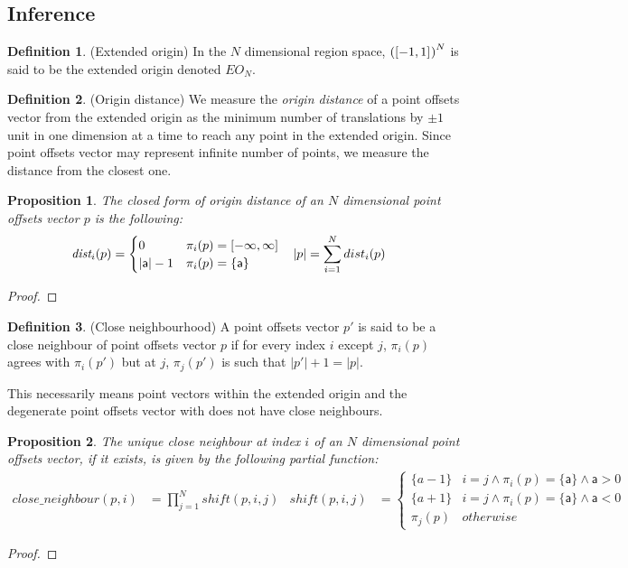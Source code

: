 \documentclass[acmlarge,review]{acmart}
\theoremstyle{definition}
\newtheorem{defn}{Definition}
\theoremstyle{plain}
\newtheorem{prop}{Proposition}
\theoremstyle{remark}
\begin{document}
\subsection{Inference}

\begin{defn}{(Extended origin)}
  In the $N$ dimensional region space, ${(\textnormal{$\lbrack-1,1\rbrack^{}$})}^N$ is said to be
  the extended origin denoted $\textit{EO}_N$.
\end{defn}

\begin{defn}{(Origin distance)}
  We measure the \emph{origin distance} of a point offsets vector from the
  extended origin as the minimum number of translations by $\pm 1$ unit in one
  dimension at a time to reach any point in the extended origin. Since point
  offsets vector may represent infinite number of points, we measure the
  distance from the closest one.
\end{defn}
%
\begin{prop}{}
  The closed form of origin distance of an $N$ dimensional point offsets vector
  $p$ is the following:
%
  \begin{align*}
    \textit{dist}_i(p) & = \begin{cases}
      0 & \pi_i(p) = \interv{-\infty}{\infty}{} \\
      |\mathsf{a}| - 1 & \pi_i(p) = \{\mathsf{a}\} \\
    \end{cases} &
%
    |p| & = \sum_{i=1}^{N} dist_i(p)
  \end{align*}
\end{prop}
%
\begin{proof}
\end{proof}

\begin{defn}{(Close neighbourhood)}
  A point offsets vector $p'$ is said to be a close neighbour of point offsets
  vector $p$ if for every index $i$ except $j$, $\pi_i(p)$ agrees with
  $\pi_i(p')$ but at $j$, $\pi_j(p')$ is such that $|p'| + 1 = |p|$.

  This necessarily means point vectors within the extended origin and the
  degenerate point offsets vector with \interv{-\infty}{\infty}{} does not have
  close neighbours.
\end{defn}
%
\begin{prop}
  The unique close neighbour at index $i$ of an $N$ dimensional point offsets
  vector, if it exists, is given by the following partial function:
%
  \begin{align*}
    \mathit{close\_neighbour}(p,i) & = \prod^{N}_{j=1} \mathit{shift}(p,i,j) &
%
    \mathit{shift}(p,i,j) & =
      \begin{cases}
        \{a - 1\} & i = j \wedge \pi_i(p) = \{\mathsf{a}\} \wedge \mathsf{a} > 0\\
        \{a + 1\} & i = j \wedge \pi_i(p) = \{\mathsf{a}\} \wedge \mathsf{a} < 0\\
        \pi_j(p)  & otherwise
      \end{cases}
  \end{align*}
\end{prop}
%
\begin{proof}
\end{proof}
\end{document}
